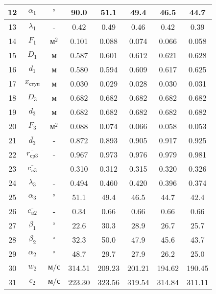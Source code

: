 \begin{center}
\begin{longtable}{|c|c|c|c|c|c|c|c|}
				12 & $\alpha_1$ & $\degree$ & 90.0 & 51.1 & 49.4 & 46.5 & 44.7 \\\hline
			
				13 & $\lambda_1$ & - & 0.42 & 0.49 & 0.46 & 0.42 & 0.39 \\\hline
			
				14 & $F_1$ & $м^2$ & 0.101 & 0.088 & 0.074 & 0.066 & 0.058 \\\hline
			
				15 & $D_1$ & м & 0.587 & 0.601 & 0.612 & 0.621 & 0.628 \\\hline
			
				16 & $d_1$ & м & 0.580 & 0.594 & 0.609 & 0.617 & 0.625 \\\hline
			
				17 & $x_{ступ}$ & м & 0.030 & 0.029 & 0.028 & 0.030 & 0.031 \\\hline
			
				18 & $D_3$ & м & 0.682 & 0.682 & 0.682 & 0.682 & 0.682 \\\hline
			
				19 & $d_3$ & м & 0.682 & 0.682 & 0.682 & 0.682 & 0.682 \\\hline
			
				20 & $F_3$ & $м^2$ & 0.088 & 0.074 & 0.066 & 0.058 & 0.053 \\\hline
			
				21 & $\overline{d_3}$ & - & 0.872 & 0.893 & 0.905 & 0.917 & 0.925 \\\hline
			
				22 & $\overline{r_{ср3}}$ & - & 0.967 & 0.973 & 0.976 & 0.979 & 0.981 \\\hline
			
				23 & $\overline{c_{u3}}$ & - & 0.310 & 0.312 & 0.315 & 0.320 & 0.326 \\\hline
			
				24 & $\lambda_3$ & - & 0.494 & 0.460 & 0.420 & 0.396 & 0.374 \\\hline
			
				25 & $\alpha_3$ & $\degree$ & 51.1 & 49.4 & 46.5 & 44.7 & 42.4 \\\hline
			
				26 & $\overline{c_{u2}}$ & - & 0.34 & 0.66 & 0.66 & 0.66 & 0.66 \\\hline
			
				27 & $\beta_1$ & $\degree$ & 22.6 & 30.3 & 28.9 & 26.7 & 25.7 \\\hline
			
				28 & $\beta_2$ & $\degree$ & 32.3 & 50.0 & 47.9 & 45.6 & 43.7 \\\hline
			
				29 & $\alpha_2$ & $\degree$ & 48.7 & 29.7 & 27.9 & 26.2 & 25.0 \\\hline
			
				30 & $w_2$ & $м/с$ & 314.51 & 209.23 & 201.21 & 194.62 & 190.45 \\\hline
			
				31 & $c_2$ & $м/с$ & 223.30 & 323.56 & 319.54 & 314.84 & 311.11 \\\hline
			
		\end{longtable}
	\end{center}
